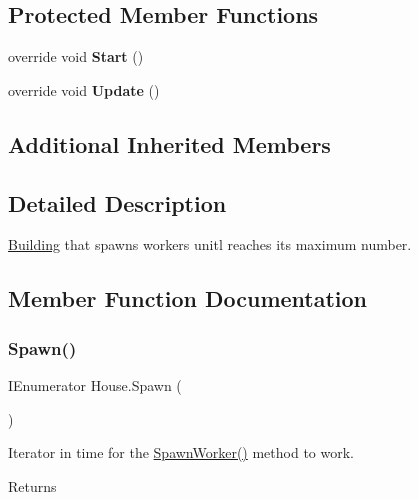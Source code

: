 \subsection*{Protected Member Functions}
\begin{DoxyCompactItemize}
\item 
\mbox{\label{class_house_aeaf2f9a20ab758406a99a5986bb8069d}} 
override void {\bfseries Start} ()
\item 
\mbox{\label{class_house_adcccad2d1bf0e6d8d1b51187cec7def8}} 
override void {\bfseries Update} ()
\end{DoxyCompactItemize}
\subsection*{Additional Inherited Members}


\subsection{Detailed Description}
\mbox{\hyperlink{class_building}{Building}} that spawns workers unitl reaches its maximum number. 



\subsection{Member Function Documentation}
\mbox{\label{class_house_a51ddcc23a76d4731dc74d26d11dc3240}} 
\subsubsection{\texorpdfstring{Spawn()}{Spawn()}}
{\footnotesize\ttfamily I\+Enumerator House.\+Spawn (\begin{DoxyParamCaption}{ }\end{DoxyParamCaption})}



Iterator in time for the \mbox{\hyperlink{class_house_a695e452216051b76e8f2eb15f3ed956d}{Spawn\+Worker()}} method to work. 

\begin{DoxyReturn}{Returns}

\end{DoxyReturn}
\mbox{\label{class_house_a695e452216051b76e8f2eb15f3ed956d}} 

